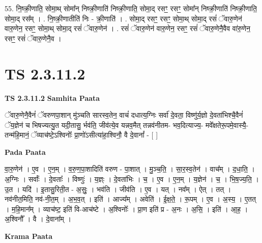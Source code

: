 \documentclass[17pt]{extarticle}
\begin{document}
55. नि॒ष्क्री॒णाति॒ सोमा॒थ् सोमा᳚न् निष्क्री॒णाति॑ निष्क्री॒णाति॒ सोमा॒द् रसꣳ॒॒ रसꣳ॒॒ सोमा᳚न् निष्क्री॒णाति॑ निष्क्री॒णाति॒ सोमा॒द् रस᳚म् । . नि॒ष्क्री॒णातीति॑ निः - क्री॒णाति॑ । . सोमा॒द् रसꣳ॒॒ रसꣳ॒॒ सोमा॒थ् सोमा॒द् रसं॑ ॅवारु॒णेन॑ वारु॒णेन॒ रसꣳ॒॒ सोमा॒थ् सोमा॒द् रसं॑ ॅवारु॒णेन॑ । . रसं॑ ॅवारु॒णेन॑ वारु॒णेन॒ रसꣳ॒॒ रसं॑ ॅवारु॒णेनै॒वैव वा॑रु॒णेन॒ रसꣳ॒॒ रसं॑ ॅवारु॒णेनै॒व । \newline
\pagebreak
{}

\section{ TS 2.3.11.2 }

\textbf{TS 2.3.11.2 } \newline
\textbf{Samhita Paata} \newline

ॅवारु॒णेनै॒वैनं॑ ॅवरुणपा॒शान् मु॑ञ्चति सारस्व॒तेन॒ वाचं॑ दधात्य॒ग्निः सर्वा॑ दे॒वता॒ विष्णु॑र्य॒ज्ञो दे॒वता॑भिश्चै॒वैनं॑ ॅय॒ज्ञेन॑ च भिषज्यत्यु॒त यदी॒तासु॒ र्भव॑ति॒ जीव॑त्ये॒व यन्नव॒मैत् तन्नव॑नीतम- भव॒दित्याज्य॒- मवे᳚क्षतेरू॒पमे॒वास्यै॒-तन्म॑हि॒मानं॒ ॅव्याच॑ष्टे॒ऽश्विनोः᳚ प्रा॒णो॑ऽसीत्या॑हा॒श्विनौ॒ वै दे॒वानां᳚ - [  ] \newline

\textbf{Pada Paata} \newline

वा॒रु॒णेन॑ । ए॒व । ए॒न॒म् । व॒रु॒ण॒पा॒शादिति॑ वरुण - पा॒शात् । मु॒ञ्च॒ति॒ । सा॒र॒स्व॒तेन॑ । वाच᳚म् । द॒धा॒ति॒ । अ॒ग्निः । सर्वाः᳚ । दे॒वताः᳚ । विष्णुः॑ । य॒ज्ञ्ः । दे॒वता॑भिः । च॒ । ए॒व । ए॒न॒म् । य॒ज्ञेन॑ । च॒ । भि॒ष॒ज्य॒ति॒ । उ॒त । यदि॑ । इ॒तासु॒रिती॒त - अ॒सुः॒ । भव॑ति । जीव॑ति । ए॒व । यत् । नव᳚म् । ऐत् । तत् । नव॑नीत॒मिति॒ नव॑-नी॒त॒म् । अ॒भ॒व॒त् । इति॑ । आज्य᳚म् । अवेति॑ । ई॒क्ष॒ते॒ । रू॒पम् । ए॒व । अ॒स्य॒ । ए॒तत् । म॒हि॒मान᳚म् । व्याच॑ष्ट॒ इति॑ वि-आच॑ष्टे । अ॒श्विनोः᳚ । प्रा॒ण इति॑ प्र - अ॒नः । अ॒सि॒ । इति॑ । आ॒ह॒ । अ॒श्विनौ᳚ । वै । दे॒वाना᳚म् ।  \newline


\textbf{Krama Paata} \newline
\end{document}
